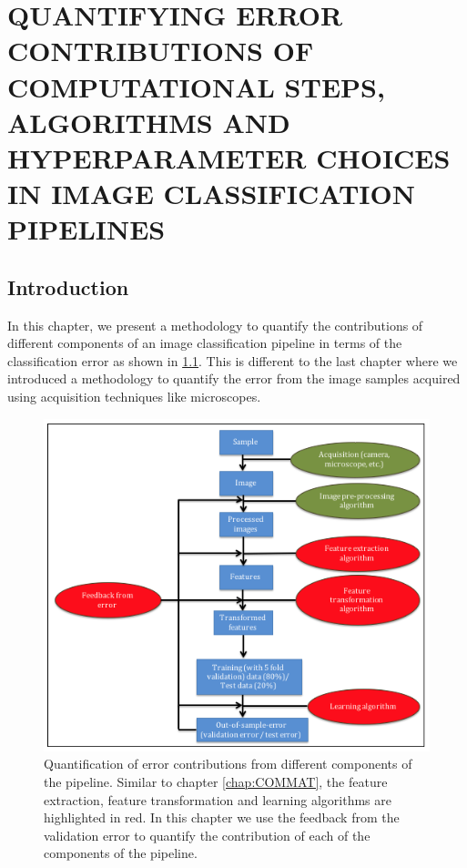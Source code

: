 \chapter{QUANTIFYING ERROR CONTRIBUTIONS OF COMPUTATIONAL STEPS, ALGORITHMS AND HYPERPARAMETER CHOICES IN IMAGE CLASSIFICATION PIPELINES}
\label{chap:EP}

\let\thefootnote\relax{}

\section{Introduction} 
\label{sec1}
In this chapter, we present a methodology to quantify the contributions of different components of an image classification pipeline in terms of the classification error as shown in \ref{fig:chapter5}. This is different to the last chapter where we introduced a methodology to quantify the error from the image samples acquired using acquisition techniques like microscopes. 

\begin{figure}[ht!]
\centering
\includegraphics[width=1.0\textwidth]{img/chapter5}
\caption{Quantification of error contributions from different components of the pipeline. Similar to  chapter \ref{chap:COMMAT}, the feature extraction, feature transformation and learning algorithms are highlighted in red. In this chapter we use the feedback from the validation error to quantify the contribution of each of the components of the pipeline.}
\label{fig:chapter5}
\end{figure}


